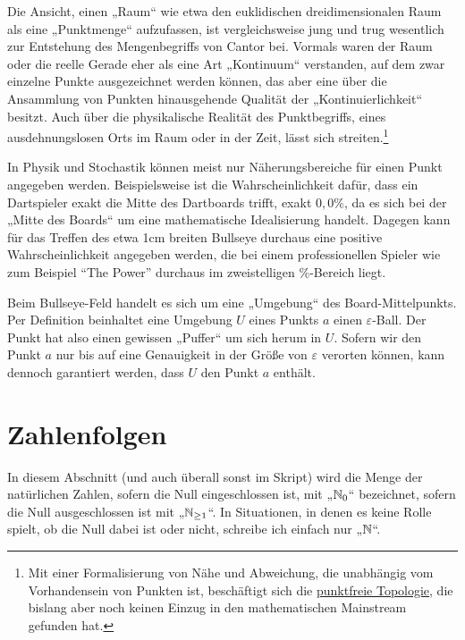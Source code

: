 \begin{bem}[Intuition]
    Die Ansicht, einen „Raum“ wie etwa den euklidischen dreidimensionalen Raum als eine „Punktmenge“ aufzufassen, ist vergleichsweise jung und trug wesentlich zur Entstehung des Mengenbegriffs von Cantor bei. Vormals waren der Raum oder die reelle Gerade eher als eine Art „Kontinuum“ verstanden, auf dem zwar einzelne Punkte ausgezeichnet werden können, das aber eine über die Ansammlung von Punkten hinausgehende Qualität der „Kontinuierlichkeit“ besitzt. Auch über die physikalische Realität des Punktbegriffs, eines ausdehnungslosen Orts im Raum oder in der Zeit, lässt sich streiten.\footnote{Mit einer Formalisierung von Nähe und Abweichung, die unabhängig vom Vorhandensein von Punkten ist, beschäftigt sich die \href{https://en.wikipedia.org/wiki/Pointless_topology}{punktfreie Topologie}, die bislang aber noch keinen Einzug in den mathematischen Mainstream gefunden hat.}
    
    In Physik und Stochastik können meist nur Näherungsbereiche für einen Punkt angegeben werden. Beispielsweise ist die Wahrscheinlichkeit dafür, dass ein Dartspieler exakt die Mitte des Dartboards trifft, exakt $0{,}0\%$, da es sich bei der „Mitte des Boards“ um eine mathematische Idealisierung handelt. Dagegen kann für das Treffen des etwa 1cm breiten Bullseye durchaus eine positive Wahrscheinlichkeit angegeben werden, die bei einem professionellen Spieler wie zum Beispiel ``The Power'' durchaus im zweistelligen \%-Bereich liegt.
    
    Beim Bullseye-Feld handelt es sich um eine „Umgebung“ des Board-Mittelpunkts. Per Definition beinhaltet eine Umgebung $U$ eines Punkts $a$ einen $\varepsilon$-Ball. Der Punkt hat also einen gewissen „Puffer“ um sich herum in $U$. Sofern wir den Punkt $a$ nur bis auf eine Genauigkeit in der Größe von $\varepsilon$ verorten können, kann dennoch garantiert werden, dass $U$ den Punkt $a$ enthält.
\end{bem}





\section{Zahlenfolgen}


\begin{bem}
    In diesem Abschnitt (und auch überall sonst im Skript) wird die Menge der natürlichen Zahlen, sofern die Null eingeschlossen ist, mit „$\mathbb N_0$“ bezeichnet, sofern die Null ausgeschlossen ist mit „$\mathbb N_{\ge 1}$“. In Situationen, in denen es keine Rolle spielt, ob die Null dabei ist oder nicht, schreibe ich einfach nur „$\mathbb N$“.
\end{bem}


